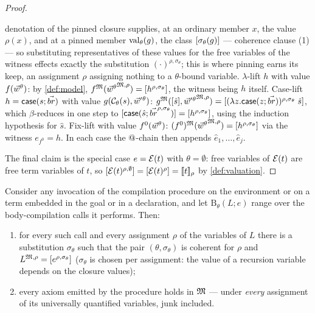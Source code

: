 \begin{proof}
\begin{itemize}[leftmargin=2em]
  denotation of the pinned closure supplies, at an ordinary member $x$,
  the value $\rho(x)$, and at a pinned member $\mathrm{val}_{\theta}(g)$, the
  class $[\sigma_\theta(g)]$ --- coherence clause (1) --- so
  substituting representatives of these values for the free variables
  of the witness effects exactly the substitution $(\cdot)^{\rho,
  \sigma_\theta}$; this is where pinning earns its keep, an assignment
  $\rho$ assigning nothing to a $\theta$-bound variable.
  $\lambda$-lift $h$ with value $f(\vec{w}{}^{\theta})$: by
  \cref{def:model}, $f^{\mathfrak{M}}({\vec{w}{}^{\theta}}^{\mathfrak{M},\rho}) =
  [h^{\rho,\sigma_\theta}]$, the witness being $h$ itself.
  Case-lift $h = \mathsf{case}(s; \vec{br})$ with value
  $g(\mathcal{C}_\theta(s), \vec{w}'{}^{\theta})$:
  $g^{\mathfrak{M}}([\hat{s}], {\vec{w}'{}^{\theta}}^{\mathfrak{M},\rho}) =
  [(\lambda z.\mathsf{case}(z; \vec{br}))^{\rho,\sigma_\theta}\;
  \hat{s}]$, which $\beta$-reduces in one step to
  $[\mathsf{case}(\hat{s}; \vec{br}^{\rho,\sigma_\theta})] =
  [h^{\rho,\sigma_\theta}]$, using the induction hypothesis for
  $\hat{s}$.  Fix-lift with value $f^0(\vec{w}{}^{\theta})$:
  $(f^0)^{\mathfrak{M}}({\vec{w}{}^{\theta}}^{\mathfrak{M},\rho}) =
  [h^{\rho,\sigma_\theta}]$ via the witness $e_{f^0} = h$.  In
  each case the $\mathbin{@}$-chain then appends $\hat{e}_1, \dots,
  \hat{e}_j$.
\end{itemize}
The final claim is the special case $e = \mathcal{E}(t)$ with $\theta =
\emptyset$: free variables of $\mathcal{E}(t)$ are free term variables of
$t$, so $[\mathcal{E}(t)^{\rho,\emptyset}] = [\mathcal{E}(t)^{\rho}] =
[\![ t ]\!]_\rho$ by \cref{def:valuation}.
\end{proof}

\begin{lemma}
\label{lem:compile-sound}
Consider any invocation of the compilation procedure on the environment
or on a term embedded in the goal or in a declaration, and let
$\mathrm{B}_\theta(L; e)$ range over the body-compilation calls it
performs.  Then:
\begin{enumerate}[leftmargin=2em]
\item for every such call and every assignment $\rho$ of the variables
  of $L$ there is a substitution $\sigma_\theta$ such that the pair
  $(\theta, \sigma_\theta)$ is coherent for $\rho$ and $L^{\mathfrak{M},\rho} =
  [e^{\rho, \sigma_\theta}]$ ($\sigma_\theta$ is chosen per
  assignment: the value of a recursion variable depends on the closure
  values);
\item every axiom emitted by the procedure holds in $\mathfrak{M}$ --- under
  \emph{every} assignment of its universally quantified variables, junk
  included.
\end{enumerate}
\end{lemma}

